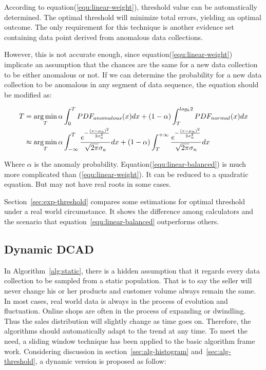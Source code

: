 \documentclass[10pt,conference,letterpaper]{IEEEtran}
\begin{document}
			According to equation(\ref{equ:linear-weight}), threshold value can be automatically determined. The optimal threshold will minimize total errors, yielding an optimal outcome. The only requirement for this technique is another evidence set containing data point derived from anomalous data collections.
			
			However, this is not accurate enough, since equation(\ref{equ:linear-weight}) implicate an assumption that the chances are the same for a new data collection to be either anomalous or not. If we can determine the probability for a new data collection to be anomalous in any segment of data sequence, the equation should be modified as:
	
			\begin{equation}\label{equ:linear-balanced}
				\small
				\begin{split}
					T & = \mathop{\arg\min}_{T} \alpha\int_{0}^{T}PDF_{anomalous}(x)dx +
					(1-\alpha)\int_{T}^{log_k2}PDF_{normal}(x)dx\\
					& \approx \mathop{\arg\min}_{T}
					\alpha\int_{-\infty}^{T}
					\frac{e^{-\frac{(x - \mu_a)^2}{2\sigma_a^2}}}{\sqrt{2\pi} \sigma_a}dx
					+ (1-\alpha)\int_{T}^{+\infty}
					\frac{e^{-\frac{(x - \mu_n)^2}{2\sigma_n^2}}}{\sqrt{2\pi} \sigma_n}dx
				\end{split}
			\end{equation}
	
			Where $\alpha$ is the anomaly probability. Equation(\ref{equ:linear-balanced}) is much more complicated than (\ref{equ:linear-weight}). It can be reduced to a quadratic equation. But may not have real roots in some cases.
			
			Section~\ref{sec:exp-threshold} compares some estimations for optimal threshold under a real world circumstance. It shows the difference among calculators and the scenario that equation~\ref{equ:linear-balanced} outperforms others.
	
		\subsection{Dynamic DCAD}\label{sec:alg-dynamic}
			In Algorithm~\ref{alg:static}, there is a hidden assumption that it regards every data collection to be sampled from a static population. That is to say the seller will never change his or her products and customer volume always remain the same. In most cases, real world data is always in the process of evolution and fluctuation. Online shops are often in the process of expanding or dwindling. Thus the sales distribution will slightly change as time goes on. Therefore, the algorithms should automatically adapt to the trend at any time. To meet the need, a sliding window technique has been applied to the basic algorithm frame work. Considering discussion in section~\ref{sec:alg-histogram} and~\ref{sec:alg-threshold}, a dynamic version is proposed as follow:
	
\end{document}
